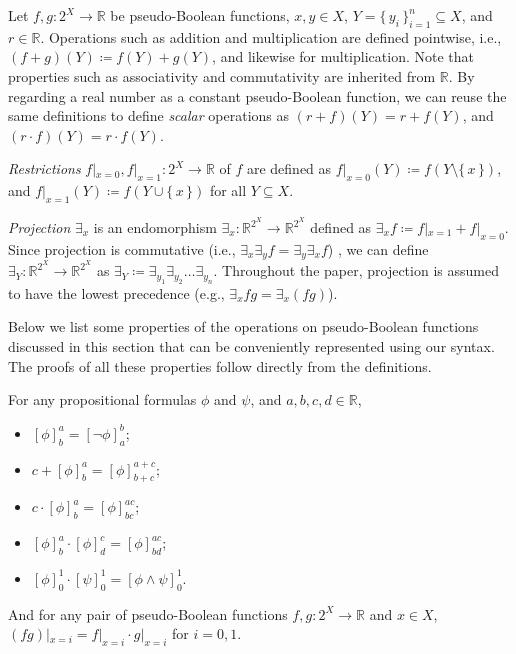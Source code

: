 \begin{definition}[Operations] \label{def:operations} Let
  $f, g\colon 2^X \to \mathbb{R}$ be pseudo-Boolean functions, $x, y \in X$,
  $Y = \{\, y_i \,\}_{i=1}^n \subseteq X$, and $r \in \mathbb{R}$. Operations
  such as addition and multiplication are defined pointwise, i.e.,
  $(f+g)(Y) \coloneqq f(Y)+g(Y)$, and likewise for multiplication. Note that
  properties such as associativity and commutativity are inherited from
  $\mathbb{R}$. By regarding a real number as a constant pseudo-Boolean
  function, we can reuse the same definitions to define \emph{scalar} operations
  as $(r+f)(Y) = r+f(Y)$, and $(r \cdot f)(Y) = r \cdot f(Y)$.

  \emph{Restrictions} $f|_{x=0}, f|_{x=1}\colon 2^X \to \mathbb{R}$ of $f$ are
  defined as $f|_{x=0}(Y) \coloneqq f(Y \setminus \{\, x \,\})$, and
  $f|_{x=1}(Y) \coloneqq f(Y \cup \{\, x \,\})$ for all $Y \subseteq X$.

  \emph{Projection} $\exists_x$ is an endomorphism
  $\exists_x\colon \mathbb{R}^{2^X} \to \mathbb{R}^{2^X}$ defined as
  $\exists_{x}f \coloneqq f|_{x=1} + f|_{x=0}$. Since projection is commutative
  (i.e., $\exists_x\exists_{y}f = \exists_y\exists_{x}f$)
  \citep{DBLP:conf/aaai/DudekPV20,DBLP:conf/cp/DudekPV20}, we can define
  $\exists_Y\colon \mathbb{R}^{2^X} \to \mathbb{R}^{2^X}$ as
  $\exists_Y \coloneqq \exists_{y_1}\exists_{y_2}\dots\exists_{y_n}$. Throughout
  the paper, projection is assumed to have the lowest precedence (e.g.,
  $\exists_x fg = \exists_x (fg)$).
\end{definition}

Below we list some properties of the operations on pseudo-Boolean functions
discussed in this section that can be conveniently represented using our syntax.
The proofs of all these properties follow directly from the definitions.

\begin{proposition}\label{prop:basic}
  For any propositional formulas $\phi$ and $\psi$, and
  $a, b, c, d \in \mathbb{R}$,
  \begin{itemize}
    \item ${[\phi]}^a_b = {[\neg \phi]}^b_a$;
    \item $c + {[\phi]}^a_b = {[\phi]}^{a+c}_{b+c}$;
    \item $c \cdot {[\phi]}^a_b = {[\phi]}^{ac}_{bc}$;
    \item ${[\phi]}^a_b \cdot {[\phi]}^c_d = {[\phi]}^{ac}_{bd}$;
    \item ${[\phi]}^1_0 \cdot {[\psi]}_0^1 = {[\phi \land \psi]}_0^1$.
  \end{itemize}
  And for any pair of pseudo-Boolean functions $f, g \colon 2^X \to \mathbb{R}$
  and $x \in X$, $(fg)|_{x=i} = f|_{x=i} \cdot g|_{x=i}$ for $i = 0, 1$.
\end{proposition}

